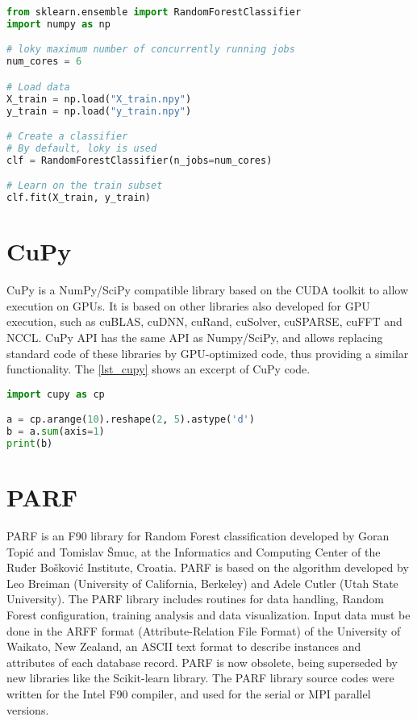 \begin{lstlisting}[float=htb, language={Python}, label={lst_loky}, caption={Excerpt of loky code.}]
from sklearn.ensemble import RandomForestClassifier
import numpy as np

# loky maximum number of concurrently running jobs
num_cores = 6

# Load data
X_train = np.load("X_train.npy")
y_train = np.load("y_train.npy")

# Create a classifier
# By default, loky is used
clf = RandomForestClassifier(n_jobs=num_cores)

# Learn on the train subset
clf.fit(X_train, y_train)
\end{lstlisting}

%
%
%
\section{CuPy}

CuPy \cite {Nishino2017} is a NumPy/SciPy compatible library based on the CUDA toolkit to allow execution on GPUs. It is based on other libraries also developed for GPU execution, such as cuBLAS, cuDNN, cuRand, cuSolver, cuSPARSE, cuFFT and NCCL. CuPy API has the same API as Numpy/SciPy, and allows replacing standard code of these libraries by GPU-optimized code, thus providing a similar functionality. The \autoref {lst_cupy} shows an excerpt of CuPy code.

\begin{lstlisting}[float=htb, language={Python}, label={lst_cupy}, caption={Excerpt of CuPy code.}]
import cupy as cp

a = cp.arange(10).reshape(2, 5).astype('d')
b = a.sum(axis=1)
print(b)
\end{lstlisting}

%
%
%
\section{PARF}
\label{sec_apprparf}

PARF \cite {Boulesteix2012} is an F90 library for Random Forest classification developed by Goran Topić and Tomislav Šmuc, at the Informatics and Computing Center of the Ruđer Bošković Institute, Croatia. PARF is based on the algorithm developed by Leo Breiman (University of California, Berkeley) and Adele Cutler (Utah State University). The PARF library includes routines for data handling, Random Forest configuration, training analysis and data visualization. Input data must be done in the ARFF format (Attribute-Relation File Format) of the University of Waikato, New Zealand, an ASCII text format to describe instances and attributes of each database record. PARF is now obsolete, being superseded by new libraries like the Scikit-learn library. The PARF library source codes were written for the Intel F90 compiler, and used for the serial or MPI parallel versions.

